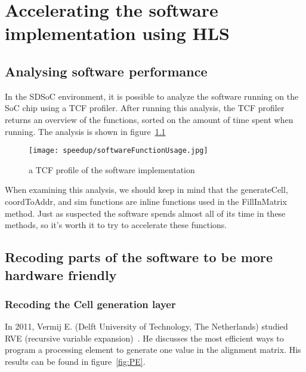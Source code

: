 
\chapter{Accelerating the software implementation using HLS}
\label{ch:HardwareImpl}

\section{Analysing software performance}
\label{swAnalyse}

In the SDSoC environment, it is possible to analyze the software running on the SoC chip using a TCF profiler. After running this analysis, the TCF profiler returns an overview of the functions, sorted on the amount of time spent when running. The analysis is shown in figure~\ref{fig:softwareFunctionUsage}

\begin{figure}[H]
	\centering
	\texttt{[image: speedup/softwareFunctionUsage.jpg]}
	\caption{a TCF profile of the software implementation}
	\label{fig:softwareFunctionUsage}
\end{figure}

When examining this analysis, we should keep in mind that the generateCell, coordToAddr, and sim functions are inline functions used in the FillInMatrix method. Just as suspected the software spends almost all of its time in these methods, so it's worth it to try to accelerate these functions.

\section{Recoding parts of the software to be more hardware friendly}

\subsection{Recoding the Cell generation layer}

In 2011, Vermij E. (Delft University of Technology, The Netherlands) studied RVE (recursive variable expansion)~\cite{Vermij}. He discusses the most efficient ways to program a processing element to generate one value in the alignment matrix. His results can be found in figure~\ref{fig:PE}. 

